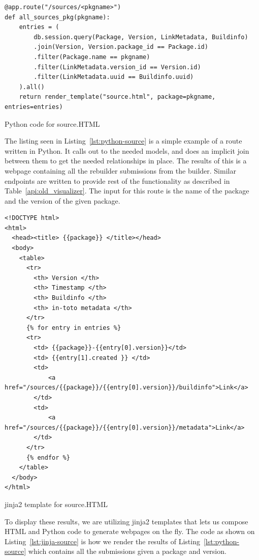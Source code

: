 \documentclass[../Main/thesis.tex]{subfiles}
\begin{document}
\begin{listing}[htpb]
\begin{verbatim}
@app.route("/sources/<pkgname>")
def all_sources_pkg(pkgname):
    entries = (
        db.session.query(Package, Version, LinkMetadata, Buildinfo)
        .join(Version, Version.package_id == Package.id)
        .filter(Package.name == pkgname)
        .filter(LinkMetadata.version_id == Version.id)
        .filter(LinkMetadata.uuid == Buildinfo.uuid)
    ).all()
    return render_template("source.html", package=pkgname, entries=entries)
\end{verbatim}
\caption{Python code for source.HTML}
\label{lst:python-source}
\end{listing}

The listing seen in Listing~\ref{lst:python-source} is a simple example of a route
written in Python. It calls out to the needed models, and does an implicit join
between them to get the needed relationships in place. The results of this is a
webpage containing all the rebuilder submissions from the builder. Similar
endpoints are written to provide rest of the functionality as described
in Table~\ref{api:old_visualizer}. The input for this route is the name of the package
and the version of the given package.


\begin{listing}[H]
\begin{verbatim}
<!DOCTYPE html>
<html>
  <head><title> {{package}} </title></head>
  <body>
    <table>
      <tr>
        <th> Version </th>
        <th> Timestamp </th>
        <th> Buildinfo </th>
        <th> in-toto metadata </th>
      </tr>
      {% for entry in entries %}
      <tr>
        <td> {{package}}-{{entry[0].version}}</td>
        <td> {{entry[1].created }} </td>
        <td> 
            <a href="/sources/{{package}}/{{entry[0].version}}/buildinfo">Link</a>
        </td>
        <td> 
            <a href="/sources/{{package}}/{{entry[0].version}}/metadata">Link</a>
        </td>
      </tr>
      {% endfor %}
    </table>
  </body>
</html>
\end{verbatim}
\caption{jinja2 template for source.HTML}
\label{lst:jinja-source}
\end{listing}

To display these results, we are utilizing jinja2 templates that lets us compose
HTML and Python code to generate webpages on the fly. The code as shown on
Listing~\ref{lst:jinja-source} is how we render the results of
Listing~\ref{lst:python-source} which contains all the submissions given a
package and version.
\end{document}
